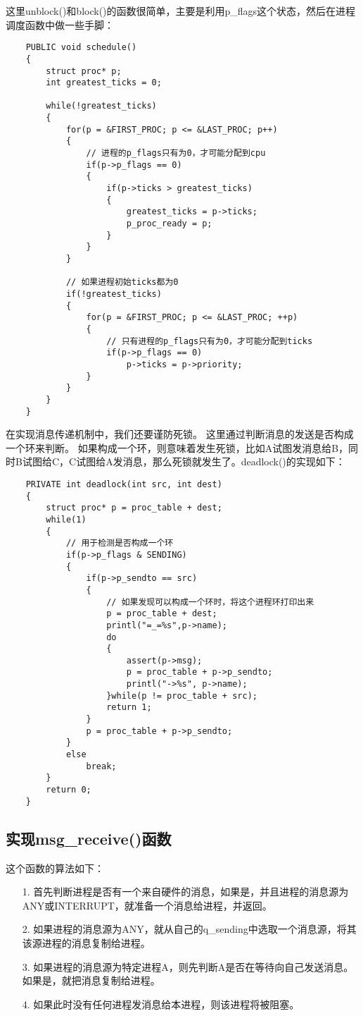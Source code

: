 \documentclass[a4paper,left=2.5cm,right=2.5cm,11pt]{article}
\begin{document}
	这里unblock()和block()的函数很简单，主要是利用p\_flags这个状态，然后在进程调度函数中做一些手脚：
	\begin{lstlisting}
	PUBLIC void schedule()
	{
		struct proc* p;
		int greatest_ticks = 0;

		while(!greatest_ticks)
		{
			for(p = &FIRST_PROC; p <= &LAST_PROC; p++)
			{
				// 进程的p_flags只有为0，才可能分配到cpu
				if(p->p_flags == 0)
				{
					if(p->ticks > greatest_ticks)
					{
						greatest_ticks = p->ticks;
						p_proc_ready = p;
					}
				}
			}

			// 如果进程初始ticks都为0
			if(!greatest_ticks)
			{
				for(p = &FIRST_PROC; p <= &LAST_PROC; ++p)
				{
					// 只有进程的p_flags只有为0，才可能分配到ticks
					if(p->p_flags == 0)
						p->ticks = p->priority;
				}
			}
		}
	}
	\end{lstlisting}

	在实现消息传递机制中，我们还要谨防死锁。
	这里通过判断消息的发送是否构成一个环来判断。
	如果构成一个环，则意味着发生死锁，比如A试图发消息给B，同时B试图给C，C试图给A发消息，那么死锁就发生了。deadlock()的实现如下：
	\begin{lstlisting}
	PRIVATE int deadlock(int src, int dest)
	{
		struct proc* p = proc_table + dest;
		while(1)
		{
			// 用于检测是否构成一个环
			if(p->p_flags & SENDING)
			{
				if(p->p_sendto == src)
				{
					// 如果发现可以构成一个环时，将这个进程环打印出来
					p = proc_table + dest;
					printl("=_=%s",p->name);
					do
					{
						assert(p->msg);
						p = proc_table + p->p_sendto;
						printl("->%s", p->name);
					}while(p != proc_table + src);
					return 1;
				}
				p = proc_table + p->p_sendto;
			}
			else
				break;
		}
		return 0;
	}
	\end{lstlisting}

\subsection{实现msg\_receive()函数}
	这个函数的算法如下：
	\begin{itemize}
		\item[1.] 首先判断进程是否有一个来自硬件的消息，如果是，并且进程的消息源为ANY或INTERRUPT，就准备一个消息给进程，并返回。
		\item[2.] 如果进程的消息源为ANY，就从自己的q\_sending中选取一个消息源，将其该源进程的消息复制给进程。
		\item[3.] 如果进程的消息源为特定进程A，则先判断A是否在等待向自己发送消息。如果是，就把消息复制给进程。
		\item[4.] 如果此时没有任何进程发消息给本进程，则该进程将被阻塞。
	\end{itemize}
\end{document}
